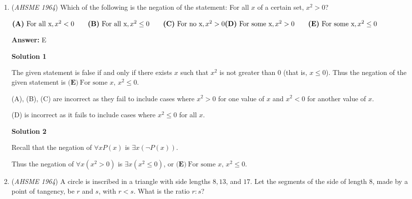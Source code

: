 \begin{enumerate}
 \textbf{Answer: }D



\textbf{Solution}

Since $2^x = (2^3)^{y+1}$, $2^x = 2^{3y+3}$ and thus $x = 3y+3$.

 Similarly, since $(3^2)^y = 3^{x-9}$, $3^{2y} = 3^{x-9}$ and thus $2y = x-9$.

 By substitution, $2y = (3y + 3) - 9 = 3y - 6$, and thus $y = 6$.  

 So $x = 3 \cdot 6 + 3 = 21$, and thus $x + y = 21 + 6 = \boxed{\textbf{(D)}\ 27}$.

 


	\item (\textit{AHSME 1964}) Which of the following is the negation of the statement: For all $x$ of a certain set, $x^2>0$?


 $\textbf{(A)}\ \text{For all x}, x^2 < 0\qquad \textbf{(B)}\ \text{For all x}, x^2 \le 0\qquad \textbf{(C)}\ \text{For no x}, x^2>0\qquad \\ \textbf{(D)}\ \text{For some x}, x^2>0\qquad \textbf{(E)}\ \text{For some x}, x^2 \le 0$

 \textbf{Answer: }E



\textbf{Solution 1}

The given statement is false if and only if there exists $x$ such that $x^2$ is not greater than $0$ (that is, $x \leq 0$).  Thus the negation of the given statement is $\boxed{\textbf{(E)}\ \text{For some }x\text{, }x^2 \leq 0}$.

 (A), (B), (C) are incorrect as they fail to include cases where $x^2 > 0$ for one value of $x$ and $x^2 < 0$ for another value of $x$.

 (D) is incorrect as it fails to include cases where $x^2 \leq 0$ for all $x$.

 



\textbf{Solution 2}

Recall that the negation of $\forall x P(x)$ is $\exists x(\lnot P(x))$.

 Thus the negation of $\forall x(x^2 > 0)$ is $\exists x(x^2 \leq 0)$, or $\boxed{\textbf{(E)}\ \text{For some }x\text{, }x^2 \leq 0}$.

 


	\item (\textit{AHSME 1964}) A circle is inscribed in a triangle with side lengths $8, 13$, and $17$. Let the segments of the side of length $8$, 
made by a point of tangency, be $r$ and $s$, with $r<s$. What is the ratio $r:s$? 



\end{enumerate}
